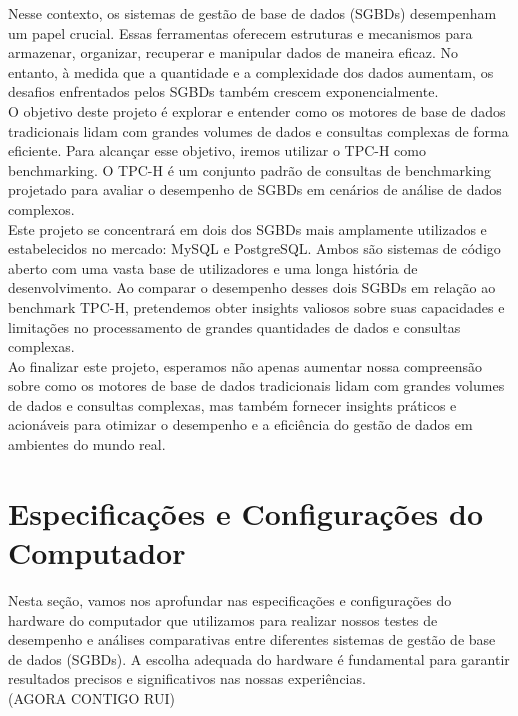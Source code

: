 \documentclass{article}
\begin{document}
\quad Nesse contexto, os sistemas de gestão de base de dados (SGBDs) desempenham um papel crucial. Essas ferramentas oferecem estruturas e mecanismos para armazenar, organizar, recuperar e manipular dados de maneira eficaz. No entanto, à medida que a quantidade e a complexidade dos dados aumentam, os desafios enfrentados pelos SGBDs também crescem exponencialmente.\\

\quad O objetivo deste projeto é explorar e entender como os motores de base de dados tradicionais lidam com grandes volumes de dados e consultas complexas de forma eficiente. Para alcançar esse objetivo, iremos utilizar o TPC-H como benchmarking. O TPC-H é um conjunto padrão de consultas de benchmarking projetado para avaliar o desempenho de SGBDs em cenários de análise de dados complexos.\\

\quad Este projeto se concentrará em dois dos SGBDs mais amplamente utilizados e estabelecidos no mercado: MySQL e PostgreSQL. Ambos são sistemas de código aberto com uma vasta base de utilizadores e uma longa história de desenvolvimento. Ao comparar o desempenho desses dois SGBDs em relação ao benchmark TPC-H, pretendemos obter insights valiosos sobre suas capacidades e limitações no processamento de grandes quantidades de dados e consultas complexas.\\

\quad Ao finalizar este projeto, esperamos não apenas aumentar nossa compreensão sobre como os motores de base de dados tradicionais lidam com grandes volumes de dados e consultas complexas, mas também fornecer insights práticos e acionáveis para otimizar o desempenho e a eficiência do gestão de dados em ambientes do mundo real.\\
\clearpage


\section{Especificações e Configurações do Computador}

\quad Nesta seção, vamos nos aprofundar nas especificações e configurações do hardware do computador que utilizamos para realizar nossos testes de desempenho e análises comparativas entre diferentes sistemas de gestão de base de dados (SGBDs). A escolha adequada do hardware é fundamental para garantir resultados precisos e significativos nas nossas experiências.\\

(AGORA CONTIGO RUI)
\end{document}
